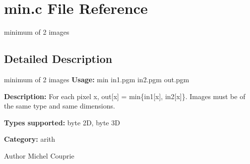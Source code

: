 \section{min.c File Reference}
\label{min_8c}


minimum of 2 images  




\subsection{Detailed Description}
minimum of 2 images {\bfseries Usage:} min in1.pgm in2.pgm out.pgm

{\bfseries Description:} For each pixel x, out[x] = min\{in1[x], in2[x]\}. Images must be of the same type and same dimensions.

{\bfseries Types supported:} byte 2D, byte 3D

{\bfseries Category:} arith

\begin{DoxyAuthor}{Author}
Michel Couprie 
\end{DoxyAuthor}
